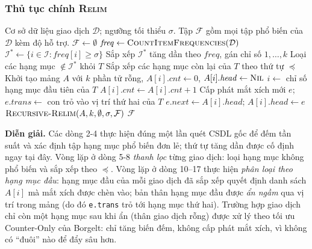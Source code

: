 \documentclass[12pt,a4paper]{report}
\begin{document}
\subsubsection*{Thủ tục chính \textsc{Relim}}


\begin{algorithm}[H]
\caption{\textsc{Relim}: thủ tục chính của thuật toán Relim}
\label{alg:relim-main}
\begin{algorithmic}[1]
\REQUIRE Cơ sở dữ liệu giao dịch $\mathcal{D}$; ngưỡng tối thiểu $\sigma$.
\ENSURE Tập $\mathcal{F}$ gồm mọi tập phổ biến của $\mathcal{D}$ kèm độ hỗ trợ.
\STATE $\mathcal{F} \leftarrow \emptyset$ 
\STATE $\mathit{freq} \leftarrow \textsc{CountItemFrequencies}(\mathcal{D})$
\STATE $\mathcal{I}^* \leftarrow \{i \in \mathcal{I} : \mathit{freq}[i] \geq \sigma\}$
\STATE Sắp xếp $\mathcal{I}^*$ tăng dần theo $\mathit{freq}$, gán chỉ số $1,\dots,k$
    \STATE Loại các hạng mục $\notin \mathcal{I}^*$ khỏi $T$
    \STATE Sắp xếp các hạng mục còn lại của $T$ theo thứ tự $\preceq$
\ENDFOR
\STATE Khởi tạo mảng $A$ với $k$ phần tử rỗng, $A[i].\mathit{cnt} \leftarrow 0$,
       $A[i].\mathit{head} \leftarrow \textsc{Nil}$
    \STATE $i \leftarrow$ chỉ số hạng mục đầu tiên của $T$
    \STATE $A[i].\mathit{cnt} \leftarrow A[i].\mathit{cnt} + 1$
        \STATE Cấp phát mắt xích mới $e$; $e.\mathit{trans} \leftarrow$ con trỏ vào
               vị trí thứ hai của $T$ 
        \STATE $e.\mathit{next} \leftarrow A[i].\mathit{head}$;
               $A[i].\mathit{head} \leftarrow e$
    \ENDIF
\ENDFOR
\STATE $\textsc{Recursive-Relim}(A, k, \emptyset, \sigma, \mathcal{F})$
\RETURN $\mathcal{F}$
\end{algorithmic}
\end{algorithm}

\noindent
\textbf{Diễn giải.} Các dòng 2-4 thực hiện đúng một lần quét CSDL gốc để đếm
tần suất và xác định tập hạng mục phổ biến đơn lẻ; thứ tự tăng dần được cố định
ngay tại đây. Vòng lặp ở dòng 5-8 \textit{thanh lọc} từng giao dịch: loại hạng
mục không phổ biến và sắp xếp theo $\preceq$. Vòng lặp ở dòng 10--17 thực hiện
\textit{phân loại theo hạng mục đầu}: hạng mục đầu của mỗi giao dịch đã sắp xếp
quyết định danh sách $A[i]$ mà mắt xích được chèn vào; bản thân hạng mục đầu
được \textit{ẩn ngầm} qua vị trí trong mảng (do đó \texttt{e.trans} trỏ tới
hạng mục thứ hai). Trường hợp giao dịch chỉ còn một hạng mục sau khi ẩn (thân
giao dịch rỗng) được xử lý theo tối ưu Counter-Only của Borgelt: chỉ tăng biến
đếm, không cấp phát mắt xích, vì không có ``đuôi'' nào để đẩy sâu hơn.
\end{document}
